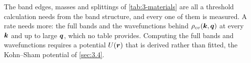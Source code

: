 The band edges, masses and splittings of \cref{tab:3-materials} are all a threshold calculation needs from the band structure, and every one of them is measured. A rate needs more: the full bands and the wavefunctions behind $\rho_{cv}(\bm{k},\bm{q})$ at every $\bm{k}$ and up to large $\bm{q}$, which no table provides. Computing the full bands and wavefunctions requires a potential $U(\bm{r})$ that is derived rather than fitted, the Kohn--Sham potential of \cref{sec:3.4}.
